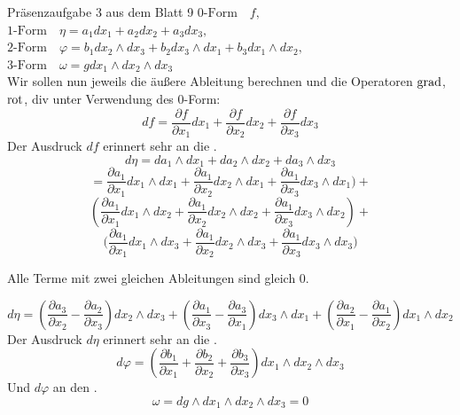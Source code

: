 \newpage 
\begin{Beispiel}{Präsenzaufgabe 3 aus dem Blatt 9}
    $\text{0-Form} \quad f,$ \\
    $\text{1-Form} \quad \eta=a_1 dx_1+a_2dx_2+a_3dx_3,$ \\
    $\text{2-Form} \quad \varphi=b_1dx_2\land dx_3 + b_2dx_3\land dx_1+b_3dx_1\land dx_2,$ \\
    $\text{3-Form} \quad \omega=gdx_1\land dx_2\land dx_3$ \\
    Wir sollen nun jeweils die äußere Ableitung berechnen und die Operatoren $\text{grad}$, $\text{rot}$, div unter Verwendung des %
    $0$-Form:\\
    $$df=\frac{\partial f}{\partial x_1}dx_1+\frac{\partial f}{\partial x_2}dx_2+\frac{\partial f}{\partial x_3}dx_3$$
    Der Ausdruck $df$ erinnert sehr an die .
    $$d\eta = da_1\land dx_1+da_2\land dx_2 + da_3\land dx_3$$
    $$={\frac{\partial a_1}{\partial x_1}dx_1\land dx_1} + \frac{\partial a_1}{\partial x_2}dx_2\land dx_1 + \frac{\partial a_1}{\partial x_3}dx_3\land dx_1) +$$ $$( \frac{\partial a_1}{\partial x_1}dx_1\land dx_2 + {\frac{\partial a_1}{\partial x_2}dx_2\land dx_2} + \frac{\partial a_1}{\partial x_3}dx_3\land dx_2) +$$ $$( \frac{\partial a_1}{\partial x_1}dx_1\land dx_3 + \frac{\partial a_1}{\partial x_2}dx_2\land dx_3 + {\frac{\partial a_1}{\partial x_3}dx_3\land dx_3)} $$
\begin{center}
        Alle Terme mit zwei gleichen Ableitungen sind gleich 0.
\end{center}

    $$d\eta = (\frac{\partial a_3}{\partial x_2}-\frac{\partial a_2}{\partial x_3})dx_2\land dx_3+(\frac{\partial a_1}{\partial x_3}-\frac{\partial a_3}{\partial x_1})dx_3\land dx_1+(\frac{\partial a_2}{\partial x_1}-\frac{\partial a_1}{\partial x_2})dx_1\land dx_2$$
    Der Ausdruck $d\eta$ erinnert sehr an die .
    $$d\varphi=(\frac{\partial b_1}{\partial x_1}+\frac{\partial b_2}{\partial x_2}+\frac{\partial b_3}{\partial x_3})dx_1\land dx_2 \land dx_3$$
    Und $d\varphi$ an den .
    $$\omega = dg\land dx_1\land dx_2\land dx_3 = 0$$
\end{Beispiel}
